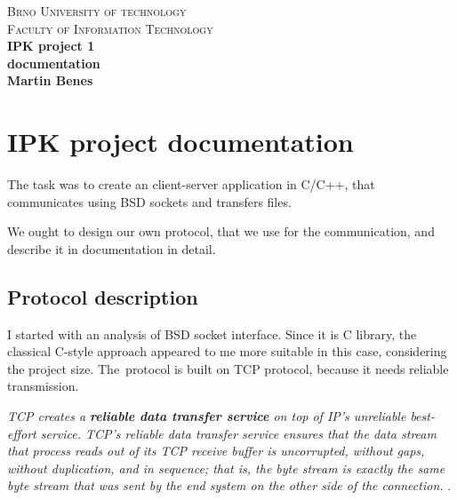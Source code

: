 \documentclass[10pt,a4paper,titlepage]{article}
\begin{document}
\begin{titlepage}

\begin{center}
\textsc{\LARGE Brno University of technology}\\[0.5cm]
\textsc{\large Faculty of Information Technology}\\[8cm]

{ \huge \bfseries IPK project 1}\\[0.3cm]
{ \Large \bfseries documentation}\\[0.5cm]
{ \bfseries Martin Benes}\\

\end{center}

\end{titlepage}
\newpage



\section*{IPK project documentation}
The task was to create an client-server application in C/C++, that communicates
using BSD sockets and transfers files.

We ought to design our own protocol, that we use for the communication, and
describe it in documentation in detail.

\subsection*{Protocol description}
I started with an analysis of BSD socket interface. Since it is C library,
the classical C-style approach appeared to me more suitable in this case,
considering the project size. The~protocol is built on TCP protocol,
because it needs reliable transmission.

{\it TCP creates a {\bf reliable data transfer service} on top of IP's unreliable
best-effort service. TCP's reliable data transfer service ensures that the
data stream that process reads out of its TCP receive buffer is uncorrupted,
without gaps, without duplication, and in sequence; that is, the byte stream
is exactly the same byte stream that was sent by the end system on the other
side of the connection.} \cite[p.~238]{computernetworking}.
\end{document}
